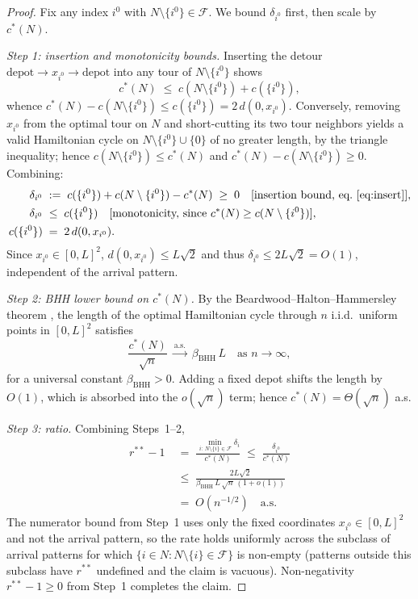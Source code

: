 \documentclass[11pt]{article}
\theoremstyle{plain}
\theoremstyle{definition}
\theoremstyle{remark}
\newcommand{\F}{\mathcal{F}}
\newcommand{\cstar}{c^{\ast}}
\begin{document}
\begin{proof}
Fix any index $i^{0}$ with $N\setminus\{i^{0}\}\in\F$. We bound $\delta_{i^{0}}$ first, then scale by $\cstar(N)$.

\emph{Step 1: insertion and monotonicity bounds.}
Inserting the detour $\text{depot}\to x_{i^{0}}\to\text{depot}$ into any tour of $N\setminus\{i^{0}\}$ shows
\begin{equation}\label{eq:insert}
\cstar(N) \;\le\; c(N\setminus\{i^{0}\}) + c(\{i^{0}\}),
\end{equation}
whence $\cstar(N) - c(N\setminus\{i^{0}\}) \le c(\{i^{0}\}) = 2\,d(0,x_{i^{0}})$.
Conversely, removing $x_{i^{0}}$ from the optimal tour on $N$ and short-cutting its two tour neighbors yields a valid Hamiltonian cycle on $N\setminus\{i^{0}\}\cup\{0\}$ of no greater length, by the triangle inequality; hence $c(N\setminus\{i^{0}\}) \le \cstar(N)$ and $\cstar(N) - c(N\setminus\{i^{0}\}) \ge 0$. Combining:
\[
\begin{aligned}
\delta_{i^{0}} & \;:=\; c(\{i^{0}\}) + c(N\setminus\{i^{0}\}) - \cstar(N) \;\ge\; 0 \quad\text{[insertion bound, eq.~\eqref{eq:insert}]}, \\
\delta_{i^{0}} & \;\le\; c(\{i^{0}\}) \quad\text{[monotonicity, since $\cstar(N) \ge c(N\setminus\{i^{0}\})$]}, \\
c(\{i^{0}\}) & \;=\; 2\,d(0,x_{i^{0}}).
\end{aligned}
\]
Since $x_{i^{0}}\in[0,L]^2$, $d(0,x_{i^{0}})\le L\sqrt{2}$ and thus $\delta_{i^{0}} \le 2L\sqrt{2} = O(1)$, independent of the arrival pattern.

\emph{Step 2: BHH lower bound on $\cstar(N)$.} By the Beardwood--Halton--Hammersley theorem \citep{beardwood1959shortest,steele1981subadditive}, the length of the optimal Hamiltonian cycle through $n$ i.i.d.\ uniform points in $[0,L]^2$ satisfies
\[
\frac{\cstar(N)}{\sqrt{n}} \;\xrightarrow{\text{a.s.}}\; \beta_{\mathrm{BHH}}\,L \quad \text{as } n\to\infty,
\]
for a universal constant $\beta_{\mathrm{BHH}}>0$. Adding a fixed depot shifts the length by $O(1)$, which is absorbed into the $o(\sqrt{n})$ term; hence $\cstar(N) = \Theta(\sqrt{n})$ a.s.

\emph{Step 3: ratio.} Combining Steps~1--2,
\[
\begin{aligned}
r^{\ast\ast}-1 & \;=\; \frac{\min_{\,i:\,N\setminus\{i\}\in\F}\delta_i}{\cstar(N)} \;\le\; \frac{\delta_{i^{0}}}{\cstar(N)} \\
& \;\le\; \frac{2L\sqrt{2}}{\beta_{\mathrm{BHH}}\,L\,\sqrt{n}\,(1+o(1))} \\
& \;=\; O(n^{-1/2}) \quad\text{a.s.}
\end{aligned}
\]
The numerator bound from Step~1 uses only the fixed coordinates $x_{i^{0}}\in[0,L]^2$ and not the arrival pattern, so the rate holds uniformly across the subclass of arrival patterns for which $\{i \in N : N\setminus\{i\}\in\F\}$ is non-empty (patterns outside this subclass have $r^{\ast\ast}$ undefined and the claim is vacuous). Non-negativity $r^{\ast\ast}-1\ge 0$ from Step~1 completes the claim.


\end{proof}
\end{document}
